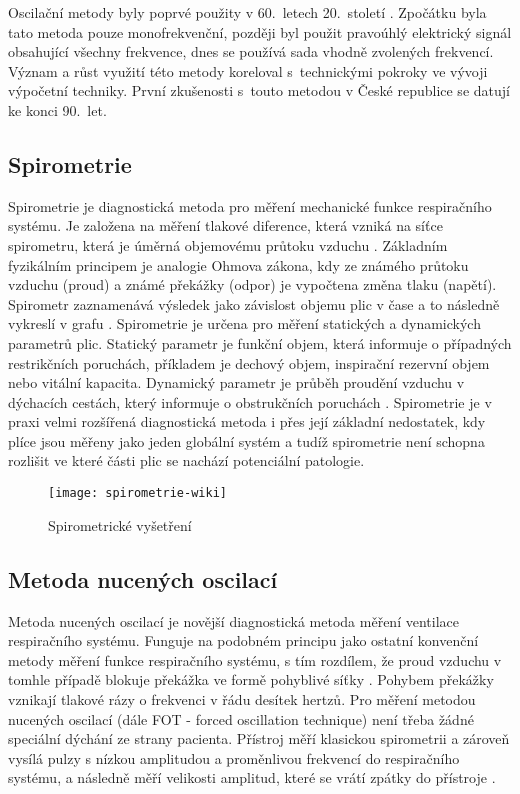 Oscilační metody byly poprvé použity v 60.~letech 20.~století \cite{Cap2000}.  Zpočátku byla tato metoda pouze monofrekvenční, později byl použit pravoúhlý elektrický signál obsahující všechny frekvence, dnes se používá sada vhodně zvolených frekvencí. Význam a růst využití této metody koreloval s~technickými pokroky ve vývoji výpočetní techniky. První zkušenosti s~touto metodou v České republice se datují ke konci 90.~let. 

\subsection{Spirometrie}
Spirometrie je diagnostická metoda pro měření mechanické funkce respiračního systému. Je založena na měření tlakové diference, která vzniká na síťce spirometru, která je úměrná objemovému průtoku vzduchu
 \cite{MEFANET}. Základním fyzikálním principem je analogie Ohmova zákona, kdy ze známého průtoku vzduchu (proud) a známé překážky (odpor) je vypočtena změna tlaku (napětí). Spirometr zaznamenává výsledek jako závislost objemu plic v čase a to následně vykreslí v grafu \cite{Medicon}. Spirometrie je určena pro měření statických a dynamických parametrů plic. Statický parametr  je funkční objem, která informuje o případných restrikčních poruchách, příkladem je dechový objem, inspirační rezervní objem nebo vitální kapacita. Dynamický parametr je průběh proudění vzduchu v dýchacích cestách, který informuje o obstrukčních poruchách \cite{lekfak}. 
Spirometrie je v praxi velmi rozšířená diagnostická metoda i přes její základní nedostatek, kdy plíce jsou měřeny jako jeden globální systém a tudíž spirometrie není schopna rozlišit ve které části plic se nachází potenciální patologie.
\begin{figure}[!h]
			\centering
 			\texttt{[image: spirometrie-wiki]}
			\caption{Spirometrické vyšetření \cite{spirowiki}}
			 \label{vysetreni}
 \end{figure}

\subsection{Metoda nucených oscilací}
Metoda nucených oscilací je novější diagnostická metoda měření ventilace respiračního systému. Funguje na podobném principu jako ostatní konvenční metody měření funkce respiračního systému, s tím rozdílem, že proud vzduchu v tomhle případě blokuje překážka ve formě pohyblivé síťky \cite{Busschots2022}. Pohybem překážky vznikají tlakové rázy o frekvenci v řádu desítek hertzů. Pro měření metodou nucených oscilací (dále FOT - forced oscillation technique) není třeba žádné speciální dýchání ze strany pacienta. Přístroj měří klasickou spirometrii a zároveň vysílá pulzy s nízkou amplitudou a proměnlivou frekvencí do respiračního systému, a následně měří velikosti amplitud, které se vrátí zpátky do přístroje \cite{Oostveen}.

